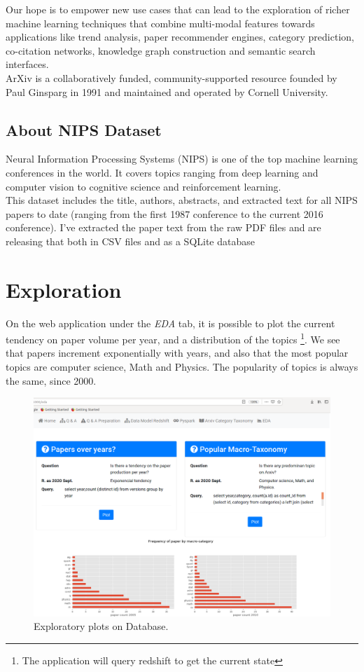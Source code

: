 Our hope is to empower new use cases that can lead to the exploration of richer machine learning techniques that combine multi-modal features towards applications like trend analysis, paper recommender engines, category prediction, co-citation networks, knowledge graph construction and semantic search interfaces.\\

ArXiv is a collaboratively funded, community-supported resource founded by Paul Ginsparg in 1991 and maintained and operated by Cornell University.\\

\subsection{About NIPS Dataset}
Neural Information Processing Systems (NIPS) is one of the top machine learning conferences in the world. It covers topics ranging from deep learning and computer vision to cognitive science and reinforcement learning.\\

This dataset includes the title, authors, abstracts, and extracted text for all NIPS papers to date (ranging from the first 1987 conference to the current 2016 conference). I've extracted the paper text from the raw PDF files and are releasing that both in CSV files and as a SQLite database\\

\section{Exploration}

On the web application under the \emph{EDA} tab, it is possible to plot the current tendency on paper volume per year, and a distribution
of the topics \footnote{The application will query redshift to get the current state}. We see that papers increment exponentially with years, and also that the most popular topics are computer science, Math and Physics. The popularity of topics is always the same, since 2000.


\begin{figure}
\centering
\includegraphics[width=1\linewidth]{images/4_eda}
\caption{Exploratory plots on Database.}
\label{fig:4_eda}
\end{figure}


